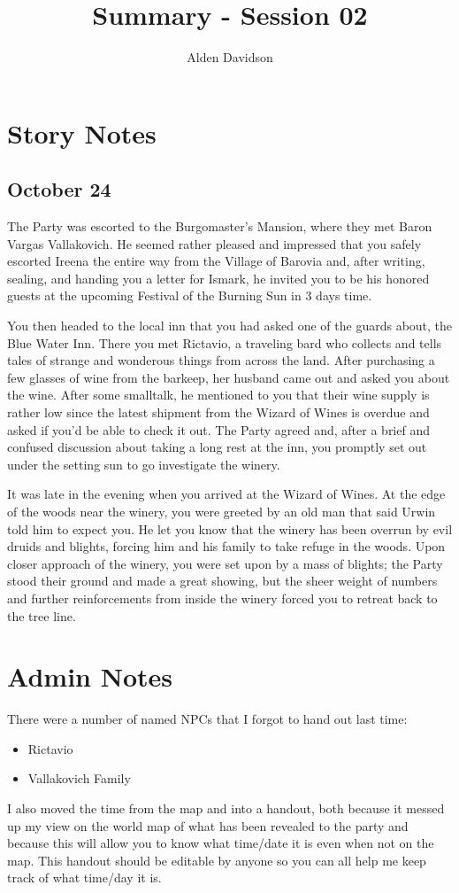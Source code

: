 \documentclass[a4paper,11pt]{article}
\title{Summary - Session 02}
\author{Alden Davidson}
\begin{document}
\maketitle

\section{Story Notes}
\subsection{October 24}
The Party was escorted to the Burgomaster's Mansion, where they met Baron Vargas Vallakovich. He seemed rather
pleased and impressed that you safely escorted Ireena the entire way from the Village of Barovia and, after 
writing, sealing, and handing you a letter for Ismark, he invited you to be his honored guests at the upcoming 
Festival of the Burning Sun in 3 days time.

You then headed to the local inn that you had asked one of the guards about, the Blue Water Inn. There you met
Rictavio, a traveling bard who collects and tells tales of strange and wonderous things from across the land. After
purchasing a few glasses of wine from the barkeep, her husband came out and asked you about the wine. After some
smalltalk, he mentioned to you that their wine supply is rather low since the latest shipment from the Wizard of 
Wines is overdue and asked if you'd be able to check it out. The Party agreed and, after a brief and confused
discussion about taking a long rest at the inn, you promptly set out under the setting sun to go investigate the
winery.

It was late in the evening when you arrived at the Wizard of Wines. At the edge of the woods near the winery, you
were greeted by an old man that said Urwin told him to expect you. He let you know that the winery has been overrun
by evil druids and blights, forcing him and his family to take refuge in the woods. Upon closer approach of the 
winery, you were set upon by a mass of blights; the Party stood their ground and made a great showing, but the sheer
weight of numbers and further reinforcements from inside the winery forced you to retreat back to the tree line.

\section{Admin Notes}
There were a number of named NPCs that I forgot to hand out last time:
\begin{itemize}
  \item Rictavio
  \item Vallakovich Family
\end{itemize}
I also moved the time from the map and into a handout, both because it messed up my view on the world map of what
has been revealed to the party and because this will allow you to know what time/date it is even when not on the
map. This handout should be editable by anyone so you can all help me keep track of what time/day it is.
\end{document}
